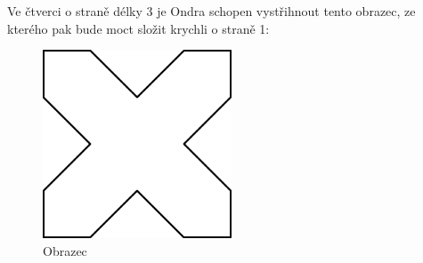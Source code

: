 \documentclass{fkssolpub}
\author{Ondřej Sedláček}
\begin{document}
Ve čtverci o straně délky 3 je Ondra schopen vystřihnout tento obrazec, ze kterého pak bude moct složit krychli o straně 1:

\begin{figure}[h!]
	\begin{center}
		\includegraphics[width=0.50\textwidth]{1-fig}
	\end{center}
	\caption{Obrazec}
	\label{fig:1}
\end{figure}
\end{document}
